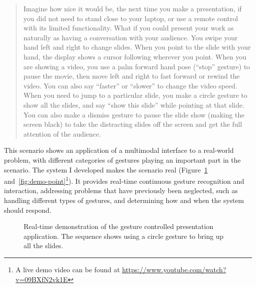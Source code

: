 \begin{quotation}
Imagine how nice it would be, the next time you make a presentation, if you did
not need to stand close to your laptop, or use a remote control with its limited
functionality. What if you could present your work as naturally as having a
conversation with your audience. You swipe your hand left and right to change
slides. When you point to the slide with your hand, the display shows a 
cursor following wherever you point. When you are showing a video, you use a
palm forward hand pose (``stop'' gesture) to pause the movie, then move left and
right to fast forward or rewind the video. You can also say ``faster'' or
``slower'' to change the video speed. When you need to jump to a particular
slide, you make a circle gesture to show all the slides, and say ``show this
slide'' while pointing at that slide. You can also make a dismiss gesture to
pause the slide show (making the screen black) to take the distracting slides
off the screen and get the full attention of the audience.
\end{quotation}

This scenario shows an application of a multimodal interface to a
real-world problem, with different categories of gestures playing an important
part in the scenario. The system I developed makes the scenario real
(Figure~\ref{fig:demo-circle}
and~\ref{fig:demo-point}\footnote{A live demo video can be found at
\url{https://www.youtube.com/watch?v=09BXfN2vk1E}}).
It provides real-time continuous gesture recognition and interaction, addressing problems that have previously been neglected, such as handling different types of gestures, and determining how and when the system should respond.


\begin{figure}[tbh]
\centering
\hspace{-0.6em}
\caption{Real-time demonstration of the gesture controlled presentation
application. The sequence shows using a circle gesture to bring up all the
slides.}
\label{fig:demo-circle}
\end{figure}

